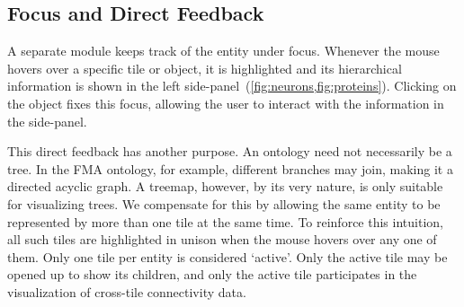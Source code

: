 \subsection{Focus and Direct Feedback} %

A separate module keeps track of the entity under focus. Whenever the mouse hovers
over a specific tile or object, it is highlighted and its hierarchical information
is shown in the left side-panel~(\cref{fig:neurons,fig:proteins}). Clicking on the object
fixes this focus, allowing the user to interact with the information in the side-panel.

This direct feedback has another purpose. An ontology need not necessarily be a
tree. In the FMA ontology, for example, different branches may join, making it a
directed acyclic graph. A treemap, however, by its very nature, is only suitable
for visualizing trees. We compensate for this by allowing the same entity to be
represented by more than one tile at the same time. To reinforce this intuition, all
such tiles are highlighted in unison when the mouse hovers over any one of them.
Only one tile per entity is considered `active'. Only the active tile may be opened
up to show its children, and only the active tile participates in the visualization
of cross-tile connectivity data.
